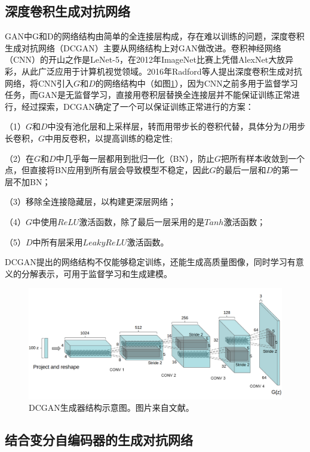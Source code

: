 \subsection{深度卷积生成对抗网络}

GAN中G和D的网络结构由简单的全连接层构成，存在难以训练的问题，深度卷积生成对抗网络（DCGAN）主要从网络结构上对GAN做改进。卷积神经网络（CNN）的开山之作是LeNet-5\cite{lecun1998gradient}，在2012年ImageNet比赛上凭借AlexNet\cite{krizhevsky2012imagenet}大放异彩，从此广泛应用于计算机视觉领域。2016年Radford等人\cite{radford2015unsupervised}提出深度卷积生成对抗网络，将CNN引入$G$和$D$的网络结构中（如图\ref{DCGAN}），因为CNN之前多用于监督学习任务，而GAN是无监督学习，直接用卷积层替换全连接层并不能保证训练正常进行，经过探索，DCGAN确定了一个可以保证训练正常进行的方案：

（1）$G$和$D$中没有池化层和上采样层，转而用带步长的卷积代替，具体分为$D$用步长卷积，$G$中用反卷积，以提高训练的稳定性;

（2）在$G$和$D$中几乎每一层都用到批归一化（BN\cite{ioffe2015batch}），防止$G$把所有样本收敛到一个点，但直接将BN应用到所有层会导致模型不稳定，因此$G$的最后一层和$D$的第一层不加BN；

（3）移除全连接隐藏层，以构建更深层网络；

（4）$G$中使用$ReLU$\cite{nair2010rectified}激活函数，除了最后一层采用的是$Tanh$激活函数；

（5）$D$中所有层采用$LeakyReLU$\cite{xu2015empirical}激活函数。

DCGAN提出的网络结构不仅能够稳定训练，还能生成高质量图像，同时学习有意义的分解表示，可用于监督学习和生成建模。

\begin{figure}[ht]
    \centering
	\includegraphics[width=\textwidth]{figs/DCGAN.png}
	\caption{DCGAN生成器结构示意图。图片来自文献\cite{radford2015unsupervised}。}
	\label{DCGAN}
\end{figure}

\subsection{结合变分自编码器的生成对抗网络}

